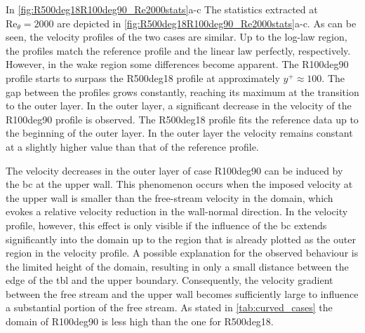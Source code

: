 In \autoref{fig:R500deg18R100deg90_Re2000stats}a-c The statistics extracted at $\mathrm{Re}_{\theta}=2000$ are depicted in \autoref{fig:R500deg18R100deg90_Re2000stats}a-c.
As can be seen, the velocity profiles of the two cases are similar. 
Up to the log-law region, the profiles  match the reference profile and the linear law perfectly, respectively.
However, in the wake region some differences become apparent.
The R100deg90 profile starts to surpass the R500deg18 profile at approximately $y^+ \approx 100$.
The gap between the profiles grows constantly, reaching its maximum at the transition to the outer layer.
In the outer layer, a significant decrease in the velocity of the R100deg90 profile is observed.
The  R500deg18 profile fits the reference data up to the beginning of the outer layer.
In the outer layer the velocity remains constant at a slightly higher value than that of the reference profile.



The velocity decreases in the outer layer of case R100deg90 can be induced by the \acrshort{bc} at the upper wall.
This phenomenon occurs when the imposed velocity at the upper wall is smaller than the free-stream velocity in the domain, which evokes a relative velocity reduction in the wall-normal direction.
In the velocity profile, however, this effect  is only visible if the influence of the \acrshort{bc} extends significantly into the domain up to the region that is already plotted as the outer region in the velocity profile.
A possible explanation for the observed behaviour is the limited height of the domain, resulting in only a small distance between the edge of the \acrshort{tbl} and the upper boundary. 
Consequently, the velocity gradient between the free stream and the upper wall becomes sufficiently large to influence a substantial portion of the free stream. 
As stated in \autoref{tab:curved_cases} the domain of R100deg90 is less high than the one for R500deg18.


